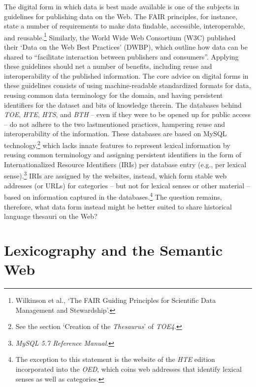 The digital form in which data is best made available is one of the subjects in guidelines for publishing data on the Web. The FAIR principles, for instance, state a number of requirements to make data findable, accessible, interoperable, and reusable.\footnote{Wilkinson et al., `The FAIR Guiding Principles for Scientific Data Management and Stewardship'.} %
Similarly, the World Wide Web Consortium (W3C) published their `Data on the Web Best Practices' (DWBP), which outline how data can be shared to ``facilitate interaction between publishers and consumers''. %
Applying these guidelines should net a number of benefits, including reuse and interoperability of the published information. The core advice on digital forms in these guidelines consists of using machine-readable standardized formats for data, reusing common data terminology for the domain, and having persistent identifiers for the dataset and bits of knowledge therein. The databases behind \textit{TOE}, \textit{HTE}, \textit{HTS}, and \textit{BTH} -- even if they were to be opened up for public access -- do not adhere to the two lastmentioned practices, hampering reuse and interoperability of the information. These databases are based on MySQL technology,\footnote{See the section `Creation of the \textit{Thesaurus}' of \textit{TOE4}.} which lacks innate features to represent lexical information by reusing common terminology and assigning persistent identifiers in the form of Internationalized Resource Identifiers (IRIs) per database entry (e.g., per lexical sense).\footnote{\textit{MySQL 5.7 Reference Manual}.} %
IRIs are assigned by the websites, instead, which form stable web addresses (or URLs) for categories -- but not for lexical senses or other material -- based on information captured in the databases.\footnote{The exception to this statement is the website of the \textit{HTE} edition incorporated into the \textit{OED}, which coins web addresses that identify lexical senses as well as categories.} The question remains, therefore, what data form instead might be better suited to share historical language thesauri on the Web?

\section{Lexicography and the Semantic Web}
\label{sect:Stolk_thes-digital-form:semweb}

